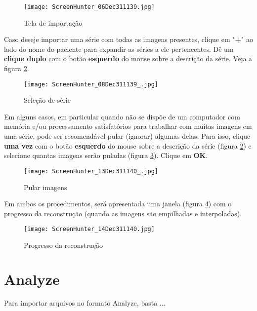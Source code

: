 \begin{figure}[!htb]
\centering
\texttt{[image: ScreenHunter\_06Dec311139.jpg]}
\caption{Tela de importação}
\label{fig:win_import}
\end{figure}

\newpage

Caso deseje importar uma série com todas as imagens presentes, clique em "\textbf{+}" ao
lado do nome do paciente para expandir as séries a ele pertencentes. Dê um \textbf{clique duplo}
com o botão \textbf{esquerdo} do mouse sobre a descrição da série. Veja a figura
\ref{fig:import_serie}.

\begin{figure}[!htb]
\centering
\texttt{[image: ScreenHunter\_08Dec311139\_.jpg]}
\caption{Seleção de série}
\label{fig:import_serie}
\end{figure}
 

Em alguns casos, em particular quando não se dispõe de um computador com memória e/ou
processamento satisfatórios para trabalhar com muitas imagens em uma série, pode ser
recomendável pular (ignorar) algumas delas. Para isso, clique \textbf{uma vez} com o botão
\textbf{esquerdo} do mouse sobre a descrição da série (figura \ref{fig:import_serie}) e selecione
quantas imagens serão puladas (figura \ref{fig:skip_image}). Clique em \textbf{OK}.

\begin{figure}[!htb]
\centering
\texttt{[image: ScreenHunter\_13Dec311140\_.jpg]}
\caption{Pular imagens}
\label{fig:skip_image}
\end{figure}


Em ambos os procedimentos, será apresentada uma janela (figura \ref{fig:prog_recons}) com o progresso
da reconstrução (quando as imagens são empilhadas e interpoladas).

\begin{figure}[!htb]
\centering
\texttt{[image: ScreenHunter\_14Dec311140.jpg]}
\caption{Progresso da reconstrução}
\label{fig:prog_recons}
\end{figure}

\newpage

\section{Analyze}
Para importar arquivos no formato Analyze, basta ...